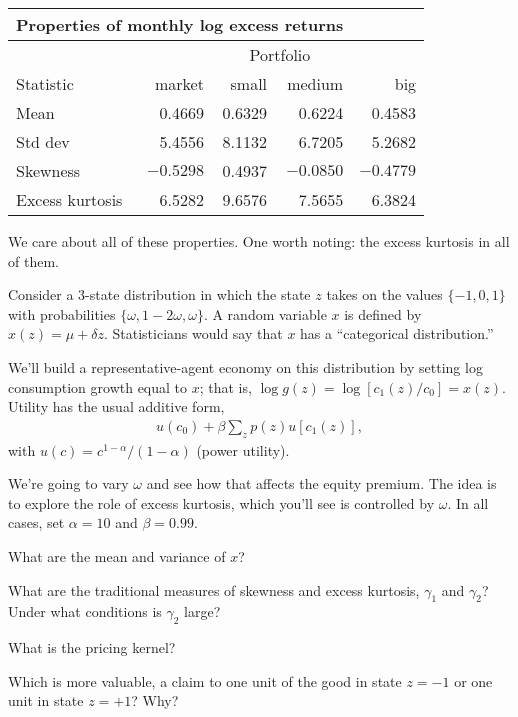 \documentclass[11pt]{exam}
\begin{document}
\begin{questions}
\begin{solution}
\begin{parts}
\medskip
\begin{center}
\begin{tabular}{lrrrr}
\multicolumn{4}{l}{Properties of monthly log excess returns} \\
\toprule
            & \multicolumn{4}{c}{Portfolio} \\
             \cmidrule{2-5}
Statistic   & market & small  & medium & big \\
\midrule
Mean            & 0.4669 & 0.6329 & 0.6224 & 0.4583 \\
Std dev         & 5.4556 & 8.1132 & 6.7205 & 5.2682 \\
Skewness        & $-0.5298$ & 0.4937 & $-0.0850$ & $-0.4779$  \\
Excess kurtosis & 6.5282 & 9.6576 & 7.5655 & 6.3824\\
\bottomrule
\end{tabular}
\end{center}

\item We care about all of these properties.
One worth noting:  the excess kurtosis in all of them.

\end{parts}
\end{solution}


Consider a 3-state distribution in which the state $z$ takes on the values
$\{-1, 0, 1\}$ with
probabilities $\{\omega, 1-2\omega, \omega \}$.
A random variable $x$ is defined by $x(z) = \mu + \delta z$.
Statisticians would say that $x$ has a ``categorical distribution.''

We'll build a representative-agent economy on this distribution
by setting log consumption growth equal to $x$;
that is, $ \log g(z) = \log [c_1(z)/c_0] = x(z)$.
Utility has the usual additive form,
\begin{eqnarray*}
    u(c_0) + \beta \sum_z p(z) u[c_1(z)] ,
\end{eqnarray*}
with $u(c) = c^{1-\alpha}/(1-\alpha)$ (power utility).


We're going to vary $\omega$ and see how that affects the equity premium.
The idea is to explore the role of excess kurtosis, which you'll see is controlled by $\omega$.
In all cases, set $\alpha = 10$ and $\beta = 0.99$.


\begin{parts}
\item What are the mean and variance of $x$?
\item What are the traditional measures of skewness and excess kurtosis,
$\gamma_1$ and $\gamma_2$?
Under what conditions is $\gamma_2$ large?
\item What is the pricing kernel?
\item Which is more valuable, a claim to one unit of the good in state $z=-1$
or one unit in state $z=+1$? Why?


\end{parts}
\end{questions}
\end{document}
